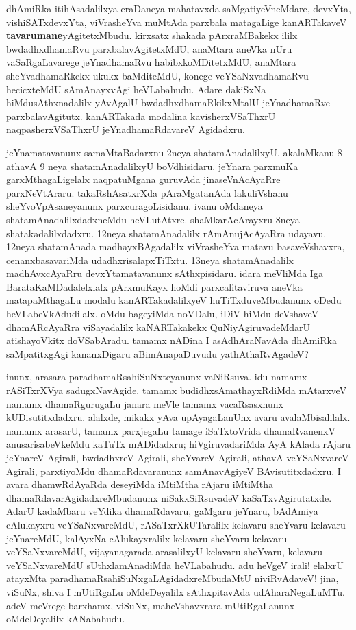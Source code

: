 \documentclass[11pt,a4size]{article}
\begin{document}
dhAmiRka itihAsadalilxya eraDaneya mahatavxda saMgatiyeVneMdare,
devxYta, vishiSATxdevxYta, viVrasheYva muMtAda parxbala matagaLige
kanARTakaveV \textbf{tavarumane}yAgitetxMbudu. kirxsatx shakada
pArxraMBakekx ililx bwdadhxdhamaRvu parxbalavAgitetxMdU, anaMtara
aneVka nUru vaSaRgaLavarege jeYnadhamaRvu habibxkoMDitetxMdU, anaMtara
sheYvadhamaRkekx ukukx baMditeMdU, konege veYSaNxvadhamaRvu
hecicxteMdU sAmAnayxvAgi heVLabahudu. Adare dakiSxNa
hiMdusAthxnadalilx yAvAgalU bwdadhxdhamaRkikxMtalU jeYnadhamaRve
parxbalavAgitutx. kanARTakada modalina kavisherxVSaThxrU
naqpasherxVSaThxrU jeYnadhamaRdavareV Agidadxru.

jeYnamatavanunx samaMtaBadarxnu 2neya shatamAnadalilxyU, akalaMkanu 8
athavA 9 neya shatamAna\-dalilxyU boVdhisidaru. jeYnara parxmuKa
garxMthagaLigelalx naqpatuMgana guruvAda jinaseVnAcAyaRre
parxNeVtAraru. takaRshAsatxrXda pAraMgatanAda lakuliVshanu
sheYvoVpAsaneyanunx parxcuragoLisidanu. ivanu oMdaneya
shatamAnadalilxdadxneMdu heVLutAtxre. shaMkarAcArayxru 8neya
shatakadalilxdadxru. 12neya shatamAnadalilx rAmAnujAcAyaRra
udayavu. 12neya shatamAnada madhayxBAgadalilx viVrasheYva matavu
basaveVshavxra,
 cenanxbasavariMda udadhxrisalapxTiTxtu. 13neya
shatamAnadalilx madhAvxcAyaRru devxYtamatavanunx sAthxpisidaru. idara
meVliMda Iga BarataKaMDadalelxlalx pArxmuKayx hoMdi parxcalitaviruva
aneVka matapaMthagaLu modalu kanARTakadalilxyeV huTiTxduveMbudanunx
oDedu heVLabeVkAdudilalx. oMdu bageyiMda noVDalu, iDiV hiMdu deVshaveV
dhamARcAyaRra viSayadalilx kaNARTakakekx QuNiyAgiruvadeMdarU
atishayoVkitx doVSabAradu. tamamx nADina I asAdhAraNavAda dhAmiRka
saMpatitxgAgi kananxDigaru aBimAnapaDuvudu yathAthaRvAgadeV?

inunx, arasara paradhamaRsahiSuNxteyanunx vaNiRsuva. idu namamx
rASiTxrXVya sadugxNavAgide. tamamx budidhxsAmathayxRdiMda mAtarxveV
namamx dhamaRgurugaLu janara meVle tamamx vacaRsasxnunx
kUDisutitxdadxru. alalxde, mikakx yAva upAyagaLanUnx avaru
avalaMbisalilalx. namamx arasarU, tamamx parxjegaLu tamage
iSaTxtoVrida dhamaRvanenxV anusarisabeVkeMdu kaTuTx mADidadxru;
hiVgiruvadariMda AyA kAlada rAjaru jeYnareV Agirali, bwdadhxreV
Agirali, sheYvareV Agirali, athavA veYSaNxvareV Agirali, parxtiyoMdu
dhamaRdavaranunx samAnavAgiyeV BAvisutitxdadxru. I avara dhamwRdAyaRda
deseyiMda iMtiMtha rAjaru iMtiMtha dhamaRdavarAgidadxreMbudanunx
niSakxSiRsuvadeV kaSaTxvAgirutatxde. AdarU kadaMbaru veYdika
dhamaRdavaru, gaMgaru jeYnaru, bAdAmiya cAlukayxru veYSaNxvareMdU,
rASaTxrXkUTaralilx kelavaru sheYvaru kelavaru jeYnareMdU, kalAyxNa
cAlukayxralilx kelavaru sheYvaru kelavaru veYSaNxvareMdU,
vijayanagarada arasalilxyU kelavaru sheYvaru, kelavaru veYSaNxvareMdU
sUthxlamAnadiMda heVLabahudu. adu heVgeV irali! elalxrU atayxMta
paradhamaRsahiSuNxgaLAgidadxreMbudaMtU niviRvAdaveV! jina, viSuNx,
shiva I mUtiRgaLu oMdeDeyalilx sAthxpitavAda udAharaNegaLuMTu. adeV
meVrege barxhamx, viSuNx, maheVshavxrara mUtiRgaLanunx oMdeDeyalilx
kANabahudu.
\end{document}

